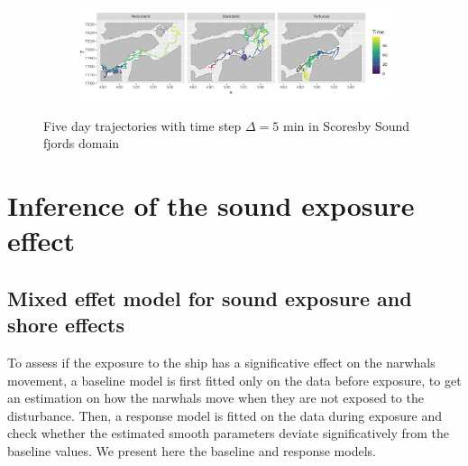 \documentclass[11pt]{article}
\newcommand {\1}{\mathbb{1}}
\theoremstyle{definition}
\theoremstyle{remark}
\theoremstyle{remark}
\begin{document}
 \begin{figure}[H]
 
 	\begin{subfigure}{0.48\textwidth}
		\includegraphics[scale=0.65]{images/crcvm/illustrative_sample_fjords}
		\label{fig:illustrativesamplefjords}
	\end{subfigure}


 	\caption{Five day trajectories with time step $\Delta=5$ min in Scoresby Sound fjords domain}
 	\label{fig: crcvm examples}
 \end{figure}







\section{Inference of the sound exposure effect}


\subsection{Mixed effet model for sound exposure and shore effects}
\label{subsection: ship exposure effect}


To assess if the exposure to the ship has a significative effect on the narwhals movement, a baseline model is first fitted only on the data before exposure, to get an estimation on how the narwhals move when they are not exposed to the disturbance. Then, a response model is fitted on the data during exposure and check whether the estimated smooth parameters deviate significatively from the baseline values. We present here the baseline and response models.\\
\end{document}

